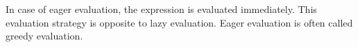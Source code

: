 In case of eager evaluation, the expression is evaluated immediately. This evaluation strategy is opposite to lazy evaluation. Eager evaluation is often called greedy evaluation.